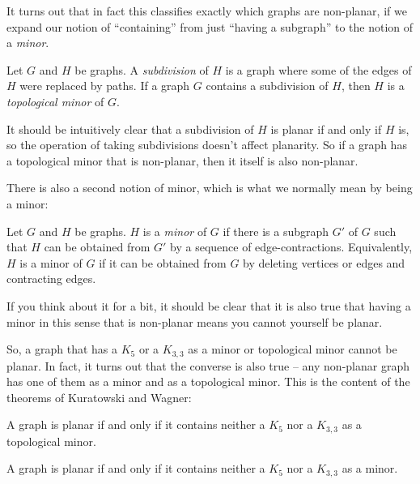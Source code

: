\documentclass[nobib]{tufte-handout}
\begin{document}
It turns out that in fact this classifies exactly which graphs are non-planar, if we expand our notion of ``containing'' from just ``having a subgraph'' to the notion of a \emph{minor}.

\begin{definition}
  Let $G$ and $H$ be graphs. A \emph{subdivision} of $H$ is a graph where some of the edges of $H$ were replaced by paths. If a graph $G$ contains a subdivision of $H$, then $H$ is a \emph{topological minor} of $G$.
\end{definition}

It should be intuitively clear that a subdivision of $H$ is planar if and only if $H$ is, so the operation of taking subdivisions doesn't affect planarity. So if a graph has a topological minor that is non-planar, then it itself is also non-planar.

There is also a second notion of minor, which is what we normally mean by being a minor:

\begin{definition}
  Let $G$ and $H$ be graphs. $H$ is a \emph{minor} of $G$ if there is a subgraph $G'$ of $G$ such that $H$ can be obtained from $G'$ by a sequence of edge-contractions. Equivalently, $H$ is a minor of $G$ if it can be obtained from $G$ by deleting vertices or edges and contracting edges.
\end{definition}

If you think about it for a bit, it should be clear that it is also true that having a minor in this sense that is non-planar means you cannot yourself be planar.

So, a graph that has a $K_5$ or a $K_{3,3}$ as a minor or topological minor cannot be planar. In fact, it turns out that the converse is also true -- any non-planar graph has one of them as a minor and as a topological minor. This is the content of the theorems of Kuratowski and Wagner:

\begin{theorem}[Kuratowski, 1930]
  A graph is planar if and only if it contains neither a $K_5$ nor a $K_{3,3}$ as a topological minor.
\end{theorem}

\begin{theorem}[Wagner, 1937]
  A graph is planar if and only if it contains neither a $K_5$ nor a $K_{3,3}$ as a minor.
\end{theorem}
\end{document}
